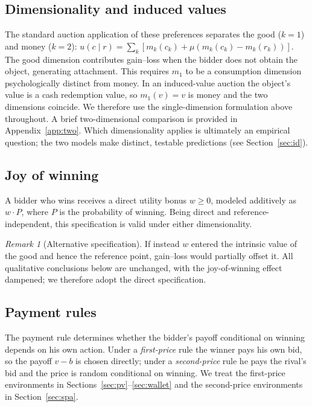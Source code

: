 \documentclass[11pt,a4paper]{article}
\theoremstyle{remark}
\newtheorem{remark}{Remark}
\begin{document}
\subsection{Dimensionality and induced values}
\label{sec:dim}
The standard auction application of these preferences
\citep{langeRatan2010} separates the good ($k=1$) and money ($k=2$):
$u(c\mid r)=\sum_k[m_k(c_k)+\mu(m_k(c_k)-m_k(r_k))]$. The good dimension contributes
gain--loss when the bidder does not obtain the object, generating attachment. This
requires $m_1$ to be a consumption dimension psychologically distinct from money.
In an induced-value auction the object's value is a cash redemption value, so
$m_1(v)=v$ is money and the two dimensions coincide. We therefore use the
single-dimension formulation above throughout. A brief two-dimensional comparison is
provided in Appendix~\ref{app:two}. Which dimensionality applies is ultimately an
empirical question; the two models make distinct, testable predictions (see
Section~\ref{sec:id}).
\subsection{Joy of winning}
A bidder who wins receives a direct utility bonus $w\ge0$, modeled additively as
$w\cdot P$, where $P$ is the probability of winning. Being direct and
reference-independent, this specification is valid under either dimensionality.
\begin{remark}[Alternative specification]
If instead $w$ entered the intrinsic value of the good and hence the reference
point, gain--loss would partially offset it. All qualitative conclusions below are
unchanged, with the joy-of-winning effect dampened; we therefore adopt the direct
specification.
\end{remark}
\subsection{Payment rules}
The payment rule determines whether the bidder's payoff conditional on winning depends
on his own action. Under a \emph{first-price} rule the winner pays his own bid, so the
payoff $v-b$ is chosen directly; under a \emph{second-price} rule he pays the rival's
bid and the price is random conditional on winning. We treat the first-price
environments in Sections~\ref{sec:pv}--\ref{sec:wallet} and the second-price
environments in Section~\ref{sec:spa}.
\end{document}
